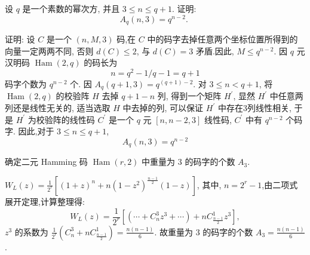 \begin{exercise}
 设 $ q $ 是一个素数的幂次方, 并且 $ 3 \leq n \leq q+1 $. 证明:
$$
A_{q}(n, 3)=q^{n-2} \text {. }
$$
\end{exercise}
\begin{solution}
    证明: 设 $ C $ 是一个 $ (n, M, 3) $ 码,在 $ C $ 中的码字去掉任意两个坐标位置所得到的向量一定两两不同, 否则 $ d(C) \leq 2 $, 与 $ d(C)=3 $ 矛盾.因此, $ M \leq q^{n-2} $. 因 $ q $ 元汉明码 $ \operatorname{Ham}(2, q) $ 的码长为
$$
n=q^{2}-1 / q-1=q+1
$$
码字个数为 $ q^{n-2} $ 个.
因 $ A_{q}(q+1,3)=q^{(q+1)-2} $. 对 $ 3 \leq n<q+1 $, 将 $ \operatorname{Ham}(2, q) $ 的校验阵 $ H $ 去掉 $ q+1-n $ 列, 得到一个矩阵 $ H^{\prime} $, 显然 $ H^{\prime} $ 中任意两列还是线性无关的, 适当选取 $ H $ 中去掉的列, 可以保证 $ H^{\prime} $ 中存在3列线性相关, 于是 $ H^{\prime} $ 为校验阵的线性码 $ C^{\prime} $ 是一个 $ q $ 元 $ [n, n-2,3] $ 线性码, $ C^{\prime} $ 中有 $ q^{n-2} $ 个码字. 因此,对于 $ 3 \leq n \leq q+1 $,
$$
A_{q}(n, 3)=q^{n-2}
$$
\end{solution}



\begin{exercise}
确定二元 Hamming 码 $ \operatorname{Ham}(r, 2) $ 中重量为 3 的码字的个数 $ A_{3} $.
\end{exercise}
\begin{solution}
 $ W_{L}(z)=\frac{1}{2^{r}}\left[(1+z)^{n}+n\left(1-z^{2}\right)^{\frac{n-1}{2}}(1-z)\right] $,
其中, $ n=2^{r}-1 $,由二项式展开定理,计算整理得:
$$
W_{L}(z)=\frac{1}{2^{r}}\left[\left(\cdots+C_{n}^{3} z^{3}+\cdots\right)+n C_{\frac{n-1}{2}}^{1} z^{3}\right],
$$
$ z^{3} $ 的系数为 $ \frac{1}{2^{r}}\left(C_{n}^{3}+n C_{\frac{n-1}{2}}^{1}\right)=\frac{n(n-1)}{6} $.
故重量为 3 的码字的个数 $ A_{3}=\frac{n(n-1)}{6} $.
\end{solution}

